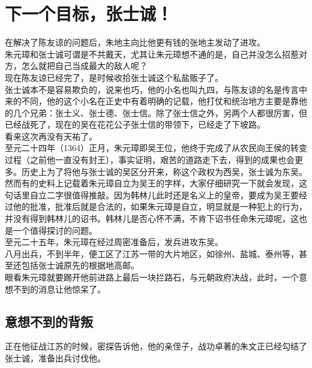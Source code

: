 \section{下一个目标，张士诚！}
\ifnum{}
	\begin{multicols}{\theparacolNo}
\fi
在解决了陈友谅的问题后，朱地主向比他更有钱的张地主发动了进攻。\\

朱元璋和张士诚可谓是不共戴天，尤其让朱元璋想不通的是，自己并没怎么招惹对方，怎么就把自己当成最大的敌人呢？\\

现在陈友谅已经完了，是时候收拾张士诚这个私盐贩子了。\\

张士诚本不是容易欺负的，说来也巧，他的小名也叫九四，与陈友谅的名是传言中来的不同，他的这个小名在正史中有着明确的记载，他打仗和统治地方主要是靠他的几个兄弟：张士义、张士德、张士信。除了张士信之外，另两个人都很厉害，但已经战死了，现在的吴在花花公子张士信的带领下，已经走了下坡路。\\

看来这次再没有天祐了。\\

至元二十四年（1364）正月，朱元璋即吴王位，他终于完成了从农民向王侯的转变过程（之前他一直没有封王），事实证明，艰苦的道路走下去，得到的成果也会更多。历史上为了将他与张士诚的吴区分开来，称这个政权为西吴，张士诚为东吴。\\

然而有的史料上记载着朱元璋自立为吴王的字样，大家仔细研究一下就会发现，这句话里自立二字很值得推敲。因为韩林儿此时还是名义上的皇帝，要成为吴王要经过他的批准，批准后就是合法的，如果朱元璋是自立，明显就是一种犯上的行为，并没有得到韩林儿的诏书。韩林儿是否心怀不满，不肯下诏书任命朱元璋呢，这也是一个值得探讨的问题。\\

至元二十五年，朱元璋在经过周密准备后，发兵进攻东吴。\\

八月出兵，不到半年，便工区了江苏一带的大片地区，如徐州、盐城、泰州等，甚至还包括张士诚原先的根据地高邮。\\

眼看朱元璋就要踢开他前进路上最后一块拦路石，与元朝政府决战，此时，一个意想不到的消息让他惊呆了。\\

\subsection{意想不到的背叛}
正在他征战江苏的时候，密探告诉他，他的亲侄子，战功卓著的朱文正已经勾结了张士诚，准备出兵讨伐他。\\


\end{multicols}
